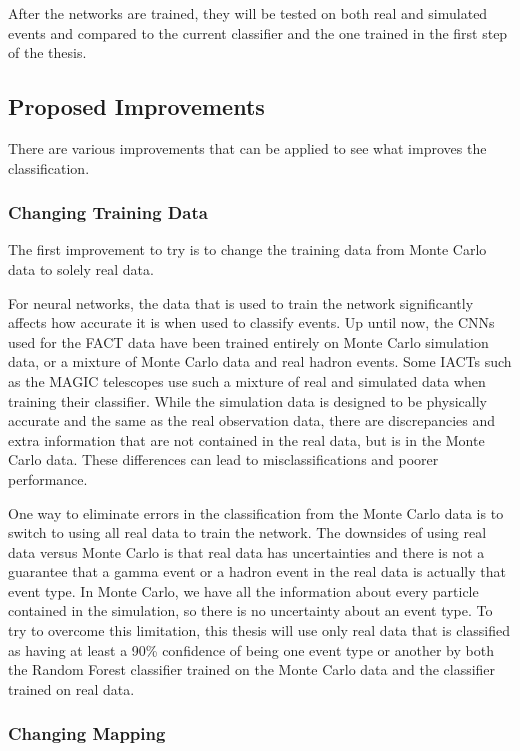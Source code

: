 \documentclass[12pt]{article}
\begin{document}
After the networks are trained, they will be tested on both real and simulated events and compared to the current classifier and the one trained in the first step of the thesis. 

\subsection{Proposed Improvements}

There are various improvements that can be applied to see what improves the classification.

\subsubsection{Changing Training Data}

The first improvement to try is to change the training data from Monte Carlo data to solely real data.

For neural networks, the data that is used to train the network significantly affects how accurate it is when used to classify events. Up until now, the CNNs used for the FACT data have been trained entirely on Monte Carlo simulation data, or a mixture of Monte Carlo data and real hadron events. Some IACTs such as the MAGIC telescopes use such a mixture of real and simulated data when training their classifier\cite{albert2008implementation}. While the simulation data is designed to be physically accurate and the same as the real observation data, there are discrepancies and extra information that are not contained in the real data, but is in the Monte Carlo data. These differences can lead to misclassifications and poorer performance.

One way to eliminate errors in the classification from the Monte Carlo data is to switch to using all real data to train the network. The downsides of using real data versus Monte Carlo is that real data has uncertainties and there is not a guarantee that a gamma event or a hadron event in the real data is actually that event type. In Monte Carlo, we have all the information about every particle contained in the simulation, so there is no uncertainty about an event type. To try to overcome this limitation, this thesis will use only real data that is classified as having at least a 90\% confidence of being one event type or another by both the Random Forest classifier trained on the Monte Carlo data and the classifier trained on real data. 

\subsubsection{Changing Mapping}
\end{document}
